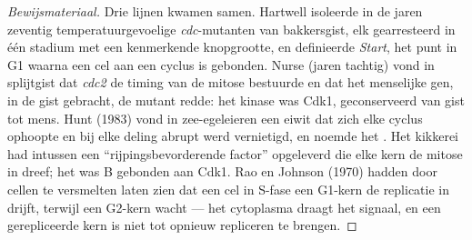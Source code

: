 \begin{proof}[Bewijsmateriaal]
Drie lijnen kwamen samen. Hartwell isoleerde in de jaren zeventig
temperatuurgevoelige \emph{cdc}-mutanten van bakkersgist, elk
gearresteerd in één stadium met een kenmerkende knopgrootte, en
definieerde \emph{Start}, het punt in G1 waarna een cel aan een cyclus
is gebonden. Nurse (jaren tachtig) vond in splijtgist dat \emph{cdc2}
de timing van de mitose bestuurde en dat het menselijke gen, in de
gist gebracht, de mutant redde: het kinase was Cdk1, geconserveerd van
gist tot mens. Hunt (1983) vond in zee-egeleieren een eiwit dat zich
elke cyclus ophoopte en bij elke deling abrupt werd vernietigd, en
noemde het . Het kikkerei had intussen een
``rijpingsbevorderende factor'' opgeleverd die elke kern de mitose in
dreef; het was  B gebonden aan Cdk1. Rao en Johnson (1970)
hadden door cellen te versmelten laten zien dat een cel in S-fase een
G1-kern de replicatie in drijft, terwijl een G2-kern wacht --- het
cytoplasma draagt het signaal, en een gerepliceerde kern is niet tot
opnieuw repliceren te brengen.
\end{proof}

